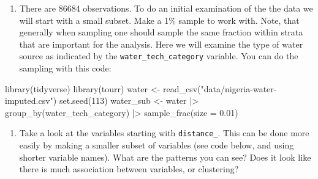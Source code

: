 \documentclass[
  letterpaper,
]{krantz}
\newenvironment{Shaded}{\begin{snugshade}}{\end{snugshade}}
\newcommand{\AttributeTok}[1]{\textcolor[rgb]{0.40,0.45,0.13}{#1}}
\newcommand{\DecValTok}[1]{\textcolor[rgb]{0.68,0.00,0.00}{#1}}
\newcommand{\FloatTok}[1]{\textcolor[rgb]{0.68,0.00,0.00}{#1}}
\newcommand{\FunctionTok}[1]{\textcolor[rgb]{0.28,0.35,0.67}{#1}}
\newcommand{\NormalTok}[1]{\textcolor[rgb]{0.00,0.23,0.31}{#1}}
\newcommand{\OtherTok}[1]{\textcolor[rgb]{0.00,0.23,0.31}{#1}}
\newcommand{\SpecialCharTok}[1]{\textcolor[rgb]{0.37,0.37,0.37}{#1}}
\newcommand{\StringTok}[1]{\textcolor[rgb]{0.13,0.47,0.30}{#1}}
\providecommand{\tightlist}{%
  \setlength{\itemsep}{0pt}\setlength{\parskip}{0pt}}
\begin{document}
\begin{enumerate}
\def\labelenumi{\arabic{enumi}.}
\tightlist
\item
  There are 86684 observations. To do an initial examination of the the
  data we will start with a small subset. Make a 1\% sample to work
  with. Note, that generally when sampling one should sample the same
  fraction within strata that are important for the analysis. Here we
  will examine the type of water source as indicated by the
  \texttt{water\_tech\_category} variable. You can do the sampling with
  this code:
\end{enumerate}

\begin{Shaded}
\begin{Highlighting}[]
\FunctionTok{library}\NormalTok{(tidyverse)}
\FunctionTok{library}\NormalTok{(tourr)}
\NormalTok{water }\OtherTok{\textless{}{-}} \FunctionTok{read\_csv}\NormalTok{(}\StringTok{"data/nigeria{-}water{-}imputed.csv"}\NormalTok{)}
\FunctionTok{set.seed}\NormalTok{(}\DecValTok{113}\NormalTok{)}
\NormalTok{water\_sub }\OtherTok{\textless{}{-}}\NormalTok{ water }\SpecialCharTok{|\textgreater{}}
  \FunctionTok{group\_by}\NormalTok{(water\_tech\_category) }\SpecialCharTok{|\textgreater{}}
  \FunctionTok{sample\_frac}\NormalTok{(}\AttributeTok{size =} \FloatTok{0.01}\NormalTok{)}
\end{Highlighting}
\end{Shaded}

\begin{enumerate}
\def\labelenumi{\arabic{enumi}.}
\setcounter{enumi}{1}
\tightlist
\item
  Take a look at the variables starting with \texttt{distance\_}. This
  can be done more easily by making a smaller subset of variables (see
  code below, and using shorter variable names). What are the patterns
  you can see? Does it look like there is much association between
  variables, or clustering?
\end{enumerate}
\end{document}
